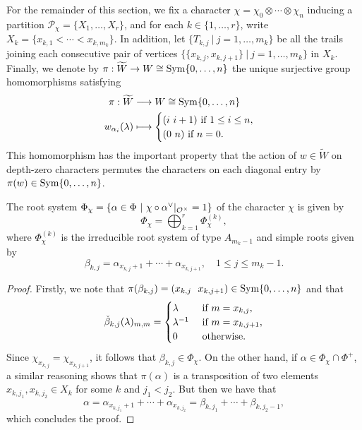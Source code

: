     For the remainder of this section, we fix a character $\chi=\chi_0\otimes\cdots\otimes\chi_n$ inducing a partition $\mathcal{P}_\chi=\{X_1,\ldots,X_r\}$, and for each $k\in\{1,\ldots,r\}$, write $X_k=\{x_{k,1}<\cdots<x_{k,m_k}\}$. In addition, let $\{T_{k,j}\ |\ j=1,\ldots,m_k\}$ be all the trails joining each consecutive pair of vertices $\{\{x_{k,j},x_{k,j+1}\}\ |\ j=1,\ldots,m_k\}$ in $X_k$. Finally, we denote by $\pi:\widetilde{W}\rightarrow W\cong \mathrm{Sym}\{0,\ldots,n\}$ the unique surjective group homomorphisms satisfying
    \begin{align*}
        \pi:\widetilde{W}&\longrightarrow W\cong \mathrm{Sym}\{0,\ldots,n\} \\
        w_{\alpha_i}(\lambda)&\longmapsto
        \begin{cases}
            (i\ i+1) \text{ if } 1\leq i\leq n,\\
            (0\ n) \text{ if } n=0.
        \end{cases}
    \end{align*}
    This homomorphism has the important property that the action of $w\in\widetilde{W}$ on depth-zero characters permutes the characters on each diagonal entry by $\pi(w)\in \mathrm{Sym}\{0,\ldots,n\}$.

    \begin{lemma}\label{lem_decomposesystem}
        The root system $\Phi_\chi=\{\alpha\in\Phi\ |\ \chi\circ\alpha^\vee|_{\mathcal{O}^\times}=1\}$ of the character $\chi$ is given by 
        $$\Phi_\chi=\bigoplus_{k=1}^r\Phi_\chi^{(k)},$$
        where $\Phi_\chi^{(k)}$ is the irreducible root system of type $A_{m_k-1}$ and simple roots given by 
        $$\beta_{k,j}=\alpha_{x_{k,j}+1}+\cdots+\alpha_{x_{k,j+1}},\quad 1\leq j\leq m_k-1.$$
    \end{lemma}

    \begin{proof}
        Firstly, we note that $\pi(\beta_{k,j})=(x_{k,j}\ \ x_{k,j+1})\in \mathrm{Sym}\{0,\ldots,n\}$ and that
        \begin{align*}
            \check{\beta}_{k,j}(\lambda)_{m,m}=
            \begin{cases}
                \lambda &\text{ if } m=x_{k,j},\\
                \lambda^{-1} &\text{ if } m=x_{k,j+1},\\
                0 &\text{ otherwise}.
            \end{cases}
        \end{align*}
        Since $\chi_{x_{k,j}}=\chi_{x_{k,j+1}}$, it follows that $\beta_{k,j}\in\Phi_\chi$. On the other hand, if $\alpha\in\Phi_\chi\cap\Phi^+$, a similar reasoning shows that $\pi(\alpha)$ is a transposition of two elements $x_{k,j_1}, x_{k,j_2}\in X_k$ for some $k$ and $j_1<j_2$. But then we have that 
        $$\alpha=\alpha_{x_{k,j_1}+1}+\cdots+\alpha_{x_{k,j_2}}=\beta_{k,j_1}+\cdots+\beta_{k,j_2-1},$$
        which concludes the proof.
    \end{proof}



